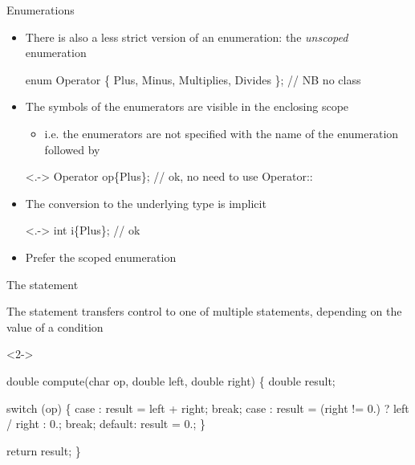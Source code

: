 \begin{frame}[fragile]{Enumerations \insertcontinuationtext}

  \begin{itemize}[<+->]
  \item There is also a less strict version of an enumeration: the
    \textit{unscoped} enumeration
    \begin{codeblock}
enum Operator \{ Plus, Minus, Multiplies, Divides \}; // NB no class\end{codeblock}

  \item The symbols of the enumerators are visible in the enclosing scope
    \begin{itemize}[<.->]
    \item i.e. the enumerators are not specified with the name of the
      enumeration followed by \code{::}
    \end{itemize}

    \begin{codeblock}<.->
Operator op\{Plus\};  // ok, no need to use Operator::
\end{codeblock}

  \item The conversion to the underlying type is implicit
    \begin{codeblock}<.->
int i\{Plus\};  // ok\end{codeblock}

  \item Prefer the scoped enumeration

  \end{itemize}

\end{frame}

\begin{frame}[fragile]{The  statement}

  The  statement transfers control to one of multiple statements,
  depending on the value of a condition

  \begin{codeblock}<2->{
double compute(char op, double left, double right)
\{
  double result;

  switch (op) \{
    case \upquote{+}:
      result = left + right;
      break;
    \ddd
    case \upquote{/}:
      result = (right != 0.) ? left / right : 0.;
      break;
    default:
      result = 0.;
  \}

  return result;
\}}\end{codeblock}

\end{frame}

